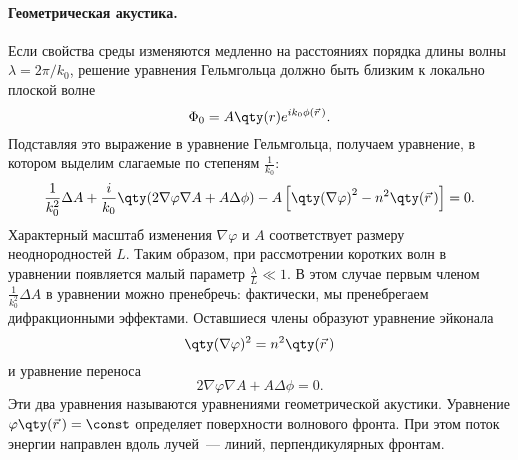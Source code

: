 \paragraph{Геометрическая акустика. } Если свойства среды изменяются медленно на расстояниях порядка длины волны $\lambda=2 \pi / k_0$, решение уравнения Гельмгольца должно быть близким к локально плоской волне
\begin{equation}
\Phi_0 =A \qty(r) e^{i k_0 \phi(\vec{r}\,)}.
\end{equation}
Подставляя это выражение в уравнение Гельмгольца, получаем уравнение, в котором выделим слагаемые по степеням $\frac{1}{k_0}$:
\begin{equation}
\frac{1}{k_0^2} \Delta A+ \frac{i}{k_0} \qty(2 \nabla \varphi \nabla A+A\Delta\phi) -A \left[{\qty(\nabla \varphi)}^2 - n^2 \qty(\vec{r}\,)\right] =0.
\end{equation}
Характерный масштаб изменения $\nabla \varphi$ и $A$ соответствует размеру неоднородностей $L$. Таким образом, при рассмотрении коротких волн в уравнении появляется малый параметр $\frac{\lambda}{L}\ll1$. В этом случае первым членом $\frac{1}{k_0^2} \Delta A$ в уравнении можно пренебречь: фактически, мы пренебрегаем дифракционными эффектами. Оставшиеся члены образуют уравнение эйконала
\begin{equation}
\qty(\nabla \varphi)^2 = n^2 \qty(\vec{r}\,)
\end{equation}
и уравнение переноса
\begin{equation}
2 \nabla \varphi \nabla A+A\Delta\phi=0.
\end{equation}
Эти два уравнения называются уравнениями геометрической акустики. Уравнение $\varphi \qty(\vec{r}\,) = \const$ определяет поверхности волнового фронта. При этом поток энергии направлен вдоль лучей~--- линий, перпендикулярных фронтам.

